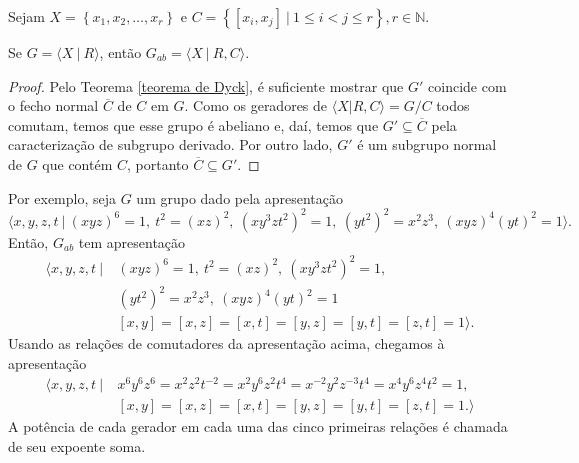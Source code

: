     	\par\vspace{0.3cm} Sejam  
    	$X = \left\{ x_1, x_2, \dots, x_r \right\}$ e $C = \left\{ [x_i, x_j] \ | \ 1\leq i < j \leq r \right\},
    	r\in\mathbb{N}$.
    	\begin{prop}
    	\label{apresentacao abelianizacao}
    		Se $G = \langle X \ | \ R \rangle$, então $G_{ab} = \langle X \ | \ R,C \rangle$.
    	\end{prop}
    	\begin{proof}
    		Pelo Teorema \ref{teorema de Dyck}, é suficiente mostrar que $G'$ coincide com o fecho normal
    		$\overline{C}$ de $C$ em $G$. Como os geradores de $\langle X|R,C \rangle = G/C$ todos comutam, 
    		temos que esse grupo é abeliano e, daí, temos que $G'\subseteq \overline{C}$ pela caracterização 
    		de subgrupo derivado. Por outro lado, $G'$ é um subgrupo normal de $G$ que contém $C$, portanto
    		$\overline{C}\subseteq G'$.
    	\end{proof}
    	Por exemplo, seja $G$ um grupo dado pela apresentação
    	\begin{equation*}
    	    \langle x,y,z,t \ | \ (xyz)^6 = 1, \ t^2 = (xz)^2, \ (xy^3zt^2)^2 = 1, \ (yt^2)^2 = x^2z^3, 
    	    \ (xyz)^4(yt)^2 = 1 \rangle.
    	\end{equation*}
    	Então, $G_{ab}$ tem apresentação
    	\begin{align*}
    	    \langle x,y,z,t \ | \ &(xyz)^6 = 1, \ t^2 = (xz)^2, \ (xy^3zt^2)^2 = 1, \\ 
        	&(yt^2)^2 = x^2z^3, \ (xyz)^4(yt)^2 = 1 \\ 
        	&[x,y] = [x,z] = [x,t] = [y,z] = [y,t] = [z,t] = 1\rangle.
    	\end{align*}
    	Usando as relações de comutadores da apresentação acima, chegamos à apresentação
    	\begin{align*}
        	\langle x,y,z,t \ | \ &x^6y^6z^6 = x^2z^2t^{-2} = x^2y^6z^2t^4 = x^{-2}y^2z^{-3}t^4 
        	= x^4y^6z^4t^2 = 1, \\
        	&[x,y] = [x,z] = [x,t] = [y,z] = [y,t] = [z,t] = 1.
        	\rangle
    	\end{align*}
    	A potência de cada gerador em cada uma das cinco primeiras relações é 
    	chamada de seu expoente soma.
    	
